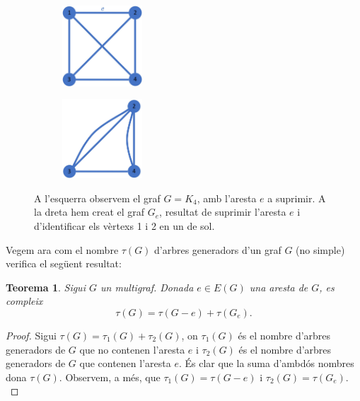 \documentclass{article}
\newtheorem{theorem}{Teorema}[section]
\begin{document}
\begin{figure}[H]
    \centering
    \begin{subfigure}{.45\textwidth}
        \centering
        \includegraphics[width=3cm]{imatges/graf_e.jpg}
    \end{subfigure}
    \begin{subfigure}{.45\textwidth}
        \centering
        \includegraphics[width=3cm]{imatges/graf_e_reduit.jpg}
    \end{subfigure}
    \caption{A l'esquerra observem el graf $G=K_4$, amb l'aresta $e$ a suprimir. A la dreta hem creat el graf $G_e$, resultat de suprimir l'aresta $e$ i d'identificar els vèrtexs 1 i 2 en un de sol.}
    \label{ge}
\end{figure}
Vegem ara com el nombre $\tau(G)$ d'arbres generadors d'un graf $G$ (no simple) verifica el següent resultat:
\begin{theorem}
Sigui $G$ un multigraf. Donada $e\in E(G)$ una aresta de $G$, es compleix $$\tau(G)=\tau(G-e)+\tau(G_e).$$
\end{theorem}
\begin{proof}
Sigui $\tau(G)=\tau_1(G)+\tau_2(G)$, on $\tau_1(G)$ és el nombre d'arbres generadors de $G$ que no contenen l'aresta $e$ i $\tau_2(G)$ és el nombre d'arbres generadors de $G$ que contenen l'aresta $e$. És clar que la suma d'ambdós nombres dona $\tau (G)$. Observem, a més, que $\tau_1(G)=\tau(G-e)$ i $\tau_2(G)=\tau(G_e)$. \cite{1}
\end{proof}
\end{document}
